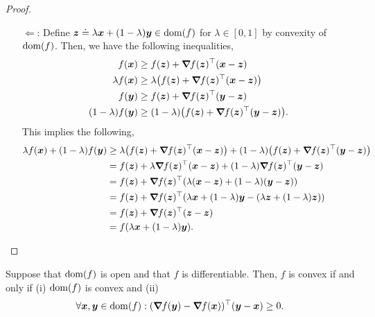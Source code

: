 \begin{proof}
\begin{enumerate}
        \item[$\Leftarrow$:] Define $\bm{z} \doteq \lambda \bm{x} + (1-\lambda) \bm{y} \in \mathrm{dom}(f)$ for $\lambda \in[0,1]$ by convexity of $\mathrm{dom}(f)$. Then, we have the following inequalities,
            \begin{align*}
                f(\vec{x}) &\geq f(\vec{z}) + \transpose{\grad{f(\vec{z})}{}} (\vec{x}-\vec{z}) \\
                \lambda f(\vec{x}) &\geq \lambda \lft( f(\vec{z}) + \transpose{\grad{f(\vec{z})}{}} (\vec{x}-\vec{z}) \rgt) \\
                f(\vec{y}) &\geq f(\vec{z}) + \transpose{\grad{f(\vec{z})}{}} (\vec{y}-\vec{z}) \\
                (1-\lambda) f(\vec{y}) &\geq (1-\lambda) \lft( f(\vec{z}) + \transpose{\grad{f(\vec{z})}{}} (\vec{y}-\vec{z}) \rgt).
            \end{align*}
            This implies the following,
            \begin{align*}
                \lambda f(\vec{x}) + (1-\lambda) f(\vec{y}) &\geq \lambda \lft( f(\vec{z}) + \transpose{\grad{f(\vec{z})}{}} (\vec{x}-\vec{z}) \rgt) + (1-\lambda) \lft( f(\vec{z}) + \transpose{\grad{f(\vec{z})}{}} (\vec{y}-\vec{z}) \rgt) \\
                                                            &= f(\vec{z}) + \lambda \transpose{\grad{f(\vec{z})}{}} (\vec{x}-\vec{z}) + (1-\lambda) \transpose{\grad{f(\vec{z})}{}} (\vec{y}-\vec{z}) \\
                                                            &= f(\vec{z}) + \transpose{\grad{f(\vec{z})}{}} \lft( \lambda (\vec{x}-\vec{z}) + (1-\lambda) (\vec{y}-\vec{z}) \rgt) \\
                                                            &= f(\vec{z}) + \transpose{\grad{f(\vec{z})}{}} \lft( \lambda \vec{x} + (1-\lambda) \vec{y} - (\lambda \vec{z} + (1-\lambda) \vec{z}) \rgt) \\
                                                            &= f(\vec{z}) + \transpose{\grad{f(\vec{z})}{}} \lft( \vec{z} - \vec{z} \rgt) \\
                                                            &= f(\lambda \vec{x} + (1-\lambda) \vec{y}).
            \end{align*}
    \end{enumerate}
\end{proof}

\begin{lemma}
    \label{lem:first-order-convexity-alt}

    Suppose that $\mathrm{dom}(f)$ is open and that $f$ is differentiable. Then, $f$ is convex if and only if (i) $\mathrm{dom}(f)$ is convex and (ii) \[
        \forall \bm{x},\bm{y}\in\mathrm{dom}(f) : (\bm{\nabla}_{\! } f(\bm{y}) - \bm{\nabla}_{\! } f(\bm{x}))^\top (\bm{y} - \bm{x}) \geq 0.
    \]
\end{lemma}

